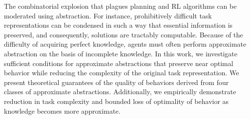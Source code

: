 The combinatorial explosion that plagues planning and \ac{RL} algorithms can be moderated using abstraction. For instance, prohibitively difficult task representations can be condensed in such a way that essential information is preserved, and consequently, solutions are tractably computable. Because of the difficulty of acquiring perfect knowledge, agents must often perform approximate abstraction on the basis of incomplete knowledge. In this work, we investigate sufficient conditions for approximate abstractions that preserve near optimal behavior while reducing the complexity of the original task representation. We present theoretical guarantees of the quality of behaviors derived from four classes of approximate abstractions. Additionally, we empirically demonstrate reduction in task complexity and bounded loss of optimality of behavior as knowledge becomes more approximate.


%
%





